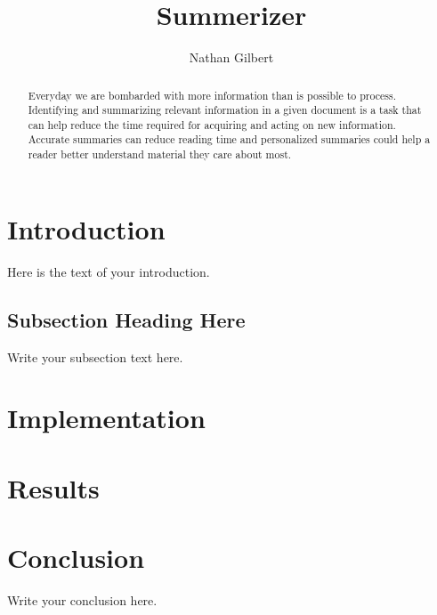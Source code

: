 \documentclass{article}
\begin{document}
\title{Summerizer}
\author{Nathan Gilbert}

\maketitle

\begin{abstract}
Everyday we are bombarded with more information than is possible to process.
Identifying and summarizing relevant information in a given document is a task
that can help reduce the time required for acquiring and acting on new
information. Accurate summaries can reduce reading time and personalized
summaries could help a reader better understand material they care about most.
\end{abstract}

\section{Introduction}
Here is the text of your introduction.

\subsection{Subsection Heading Here}
Write your subsection text here.

\section{Implementation}

\section{Results}

\section{Conclusion}
Write your conclusion here.
\end{document}
